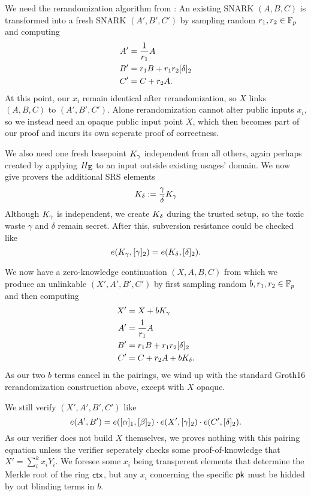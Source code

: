 We need the rerandomization algorithm from \cite[Fig.~1]{RandomizationGroth16}:
An existing SNARK $(A,B,C)$ is transformed into a fresh
SNARK $(A',B',C')$ by sampling random $r_1,r_2 \in \mathbb{F}_p$ and computing
$$ \begin{aligned}
A' &= {1 \over r_1} A \\
B' &= r_1 B + r_1 r_2 [\delta]_2 \\
C' &= C + r_2 A . \\
\end{aligned} $$
At this point, our $x_i$ remain identical after rerandomization,
so $X$ links $(A,B,C)$ to $(A',B',C')$.
Alone rerandomization cannot alter public inputs $x_i$, so
we instead need an opaque public input point $X$, which then becomes
part of our proof and incurs its own seperate proof of correctness.

We also need one fresh basepoint $K_\gamma$ independent from all others,
again perhaps created by applying $H_{\mathbf{E}}$ to an input outside existing usages' domain.
We now give provers the additional SRS elements
$$ K_\delta := {\gamma\over\delta} K_\gamma $$
Although $K_\gamma$ is independent, 
we create $K_\delta$ during the trusted setup,
 so the toxic waste $\gamma$ and $\delta$ remain secret.
After this, subversion resistance could be checked like 
$$ e(K_\gamma, [\gamma]_2) = e(K_\delta, [\delta]_2) . $$

We now have a zero-knowledge continuation $(X,A,B,C)$ from which
we produce an unlinkable $(X',A',B',C')$ by
 first sampling random $b,r_1,r_2 \in \mathbb{F}_p$ and then computing
$$ \begin{aligned}
X' &= X + b K_\gamma \\
A' &= {1 \over r_1} A \\
B' &= r_1 B + r_1 r_2 [\delta]_2 \\
C' &= C + r_2 A + b K_\delta . \\
\end{aligned} $$
As our two $b$ terms cancel in the pairings, we wind up with the standard Groth16
 rerandomization construction above, except with $X$ opaque.

We still verify $(X',A',B',C')$ like 
$$ e(A',B') = e([\alpha]_1, [\beta]_2) \cdot
 e(X', [\gamma]_2) \cdot e(C', [\delta]_2) . $$
As our verifier does not build $X$ themselves, we proves nothing
with this pairing equation unless the verifier seperately checks
 some proof-of-knowledge that $X' = \sum_i^k x_i Y_i$.
We foresee some $x_i$ being transperent elements that determine the
Merkle root of the ring $\mathsf{ctx}$, but any $x_i$ concerning the
 specific $\mathsf{pk}$ must be hidded by out blinding terms in $b$.


